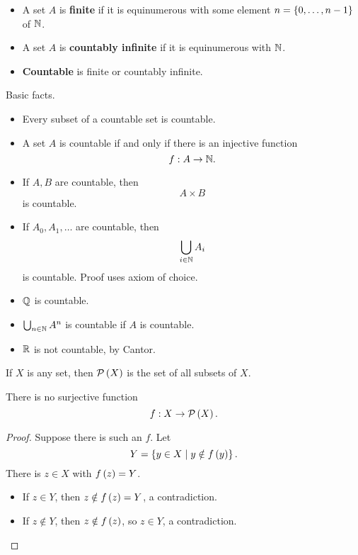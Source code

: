 \begin{definition}
\hfill
\begin{itemize}
\item A set $ A $ is \textbf{finite} if it is equinumerous with some element $ n = \left\{ 0, \dots, n - 1 \right\} $ of $ \mathbb{N} $.
\item A set $ A $ is \textbf{countably infinite} if it is equinumerous with $ \mathbb{N} $.
\item \textbf{Countable} is finite or countably infinite.
\end{itemize}
\end{definition}

\pagebreak

\begin{remark}
Basic facts.
\begin{itemize}
\item Every subset of a countable set is countable.
\item A set $ A $ is countable if and only if there is an injective function
$$ f : A \to \mathbb{N}. $$
\item If $ A, B $ are countable, then
$$ A \times B $$
is countable.
\item If $ A_0, A_1, \dots $ are countable, then
$$ \bigcup_{i \in \mathbb{N}} A_i $$
is countable. Proof uses axiom of choice.
\end{itemize}
\end{remark}

\begin{example*}
\hfill
\begin{itemize}
\item $ \mathbb{Q} $ is countable.
\item $ \bigcup_{n \in \mathbb{N}} A^n $ is countable if $ A $ is countable.
\item $ \mathbb{R} $ is not countable, by Cantor.
\end{itemize}
\end{example*}

If $ X $ is any set, then $ \mathcal{P}\left( X \right) $ is the set of all subsets of $ X $.

\begin{theorem}[Cantor]
\label{thm:3.1.4}
There is no surjective function
$$ f : X \to \mathcal{P}\left( X \right). $$
\end{theorem}

\begin{proof}
Suppose there is such an $ f $. Let
$$ Y = \left\{ y \in X \mid y \notin f\left( y \right) \right\}. $$
There is $ z \in X $ with $ f\left( z \right) = Y $.
\begin{itemize}
\item If $ z \in Y $, then $ z \notin f\left( z \right) = Y $, a contradiction.
\item If $ z \notin Y $, then $ z \notin f\left( z \right) $, so $ z \in Y $, a contradiction.
\end{itemize}
\end{proof}

